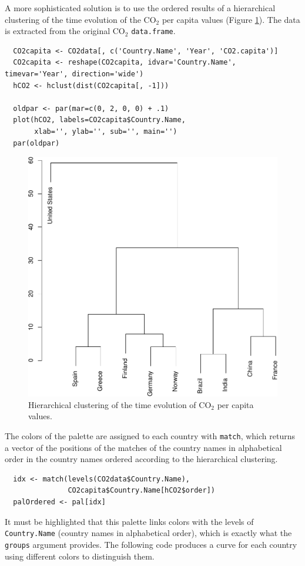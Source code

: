 \documentclass[smallroyalvopaper]{memoir}
\begin{document}
A more sophisticated solution is to use the ordered results of a
hierarchical clustering of the time evolution of the \(\mathrm{CO_2}\) per capita
values (Figure \ref{fig:hclustCO2}). The data is extracted from the
original \(\mathrm{CO_2}\) \texttt{data.frame}.  


\lstset{language=r,label= ,caption= ,captionpos=b,numbers=none}
\begin{lstlisting}
  CO2capita <- CO2data[, c('Country.Name', 'Year', 'CO2.capita')]
  CO2capita <- reshape(CO2capita, idvar='Country.Name', timevar='Year', direction='wide')
  hCO2 <- hclust(dist(CO2capita[, -1]))
  
  oldpar <- par(mar=c(0, 2, 0, 0) + .1)
  plot(hCO2, labels=CO2capita$Country.Name,
       xlab='', ylab='', sub='', main='')
  par(oldpar)
\end{lstlisting}

\begin{figure}[htbp]
\centering
\includegraphics[width=.9\linewidth]{figs/hclust.pdf}
\caption{Hierarchical clustering of the time evolution of \(\mathrm{CO_2}\) per capita values. \label{fig:hclustCO2}}
\end{figure}


The colors of the palette are assigned to each country with \texttt{match},
which returns a vector of the positions of the matches of the country
names in alphabetical order in the country names ordered according to
the hierarchical clustering.
\lstset{language=r,label= ,caption= ,captionpos=b,numbers=none}
\begin{lstlisting}
  idx <- match(levels(CO2data$Country.Name), 
               CO2capita$Country.Name[hCO2$order])
  palOrdered <- pal[idx]  
\end{lstlisting}
It must be highlighted that this palette links colors with the levels
of \texttt{Country.Name} (country names in alphabetical order), which is
exactly what the \texttt{groups} argument provides. The following code
produces a curve for each country using different colors to
distinguish them.
\end{document}
